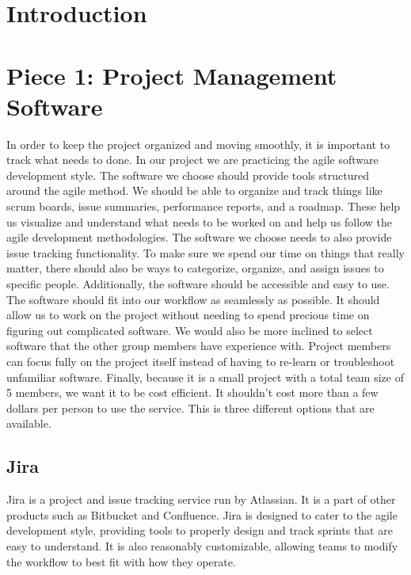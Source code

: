 \documentclass[onecolumn, draftclsnofoot,10pt, compsoc]{IEEEtran}
\begin{document}
\newpage
{}
\tableofcontents
\clearpage

\section{Introduction}


\section{Piece 1: Project Management Software}
In order to keep the project organized and moving smoothly, it is important to track what needs to done.
In our project we are practicing the agile software development style.
The software we choose should provide tools structured around the agile method.
We should be able to organize and track things like scrum boards, issue summaries, performance reports, and a roadmap.
These help us visualize and understand what needs to be worked on and help us follow the agile development methodologies. 
The software we choose needs to also provide issue tracking functionality.
To make sure we spend our time on things that really matter, there should also be ways to categorize, organize, and assign issues to specific people.
Additionally, the software should be accessible and easy to use.  
The software should fit into our workflow as seamlessly as possible.
It should allow us to work on the project without needing to spend precious time on figuring out complicated software.
We would also be more inclined to select software that the other group members have experience with.
Project members can focus fully on the project itself instead of having to re-learn or troubleshoot unfamiliar software.
Finally, because it is a small project with a total team size of 5 members, we want it to be cost efficient.
It shouldn’t cost more than a few dollars per person to use the service.
This is three different options that are available.

\subsection{Jira}
Jira is a project and issue tracking service run by Atlassian.
It is a part of other products such as Bitbucket and Confluence.
Jira is designed to cater to the agile development style, providing tools to properly design and track sprints that are easy to understand.
It is also reasonably customizable, allowing teams to modify the workflow to best fit with how they operate.
\end{document}

